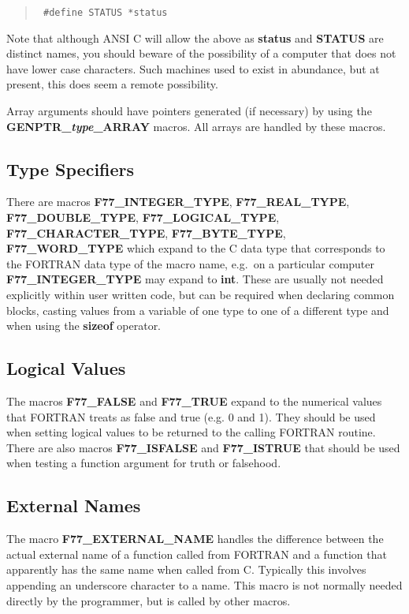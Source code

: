 \begin{quote}{\tt
\#define STATUS *status
}
\end{quote}

Note that although ANSI C will allow the above as {\bf status} and {\bf STATUS}
are distinct names, you should beware of the possibility of a computer that
does not have lower case characters. Such machines used to exist in abundance,
but at present, this does seem a remote possibility.

Array arguments should have pointers generated (if necessary) by using the {\bf
GENPTR\_{\em type}\_ARRAY} macros. All arrays are handled by these macros.

\subsection{Type Specifiers}

There are macros {\bf F77\_\-INTEGER\_\-TYPE}, {\bf F77\_\-REAL\_\-TYPE}, {\bf
F77\_\-DOUBLE\_\-TYPE}, {\bf F77\_\-LOGICAL\_\-TYPE}, {\bf
F77\_\-CHARACTER\_\-TYPE}, {\bf F77\_\-BYTE\_\-TYPE}, {\bf F77\_\-WORD\_\-TYPE}
which expand to the C data type that corresponds to the FORTRAN data type of
the macro name, e.g.\ on a particular computer {\bf F77\_\-INTEGER\_\-TYPE} may
expand to {\bf int}. These are usually not needed explicitly within user
written code, but can be required when declaring common blocks, casting values
from a variable of one type to one of a different type and when using the {\bf
sizeof} operator.

\subsection{Logical Values}

The macros {\bf F77\_\-FALSE} and {\bf F77\_\-TRUE} expand to the numerical
values that FORTRAN treats as false and true (e.g. 0 and 1). They should be used
when setting logical values to be returned to the calling FORTRAN routine.
There are also macros {\bf F77\_\-ISFALSE} and {\bf F77\_\-ISTRUE} that should
be used when testing a function argument for truth or falsehood.

\subsection{External Names}

The macro {\bf F77\_\-EXTERNAL\_\-NAME} handles the difference between the
actual external name of a function called from FORTRAN and a function that
apparently has the same name when called from C. Typically this involves
appending an underscore character to a name. This macro is not normally needed
directly by the programmer, but is called by other macros.


